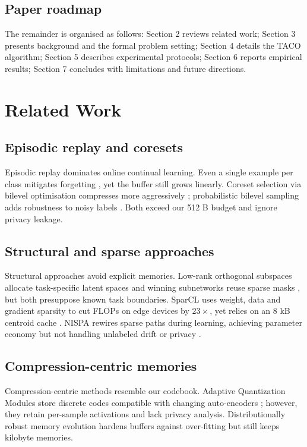 \documentclass{article}
\begin{document}
\subsection{Paper roadmap}
The remainder is organised as follows: Section 2 reviews related work; Section 3 presents background and the formal problem setting; Section 4 details the TACO algorithm; Section 5 describes experimental protocols; Section 6 reports empirical results; Section 7 concludes with limitations and future directions.

\section{Related Work}
\subsection{Episodic replay and coresets}
Episodic replay dominates online continual learning. Even a single example per class mitigates forgetting \cite{chaudhry-2019-continual}, yet the buffer still grows linearly. Coreset selection via bilevel optimisation compresses more aggressively \cite{borsos-2020-coresets}; probabilistic bilevel sampling adds robustness to noisy labels \cite{zhou-2023-probabilistic}. Both exceed our 512 B budget and ignore privacy leakage.

\subsection{Structural and sparse approaches}
Structural approaches avoid explicit memories. Low-rank orthogonal subspaces allocate task-specific latent spaces \cite{chaudhry-2020-continual} and winning subnetworks reuse sparse masks \cite{kang-2023-forget}, but both presuppose known task boundaries. SparCL uses weight, data and gradient sparsity to cut FLOPs on edge devices by $23\times$, yet relies on an 8 kB centroid cache \cite{wang-2022-sparcl}. NISPA rewires sparse paths during learning, achieving parameter economy but not handling unlabeled drift or privacy \cite{gurbuz-2022-nispa}.

\subsection{Compression-centric memories}
Compression-centric methods resemble our codebook. Adaptive Quantization Modules store discrete codes compatible with changing auto-encoders \cite{caccia-2019-online}; however, they retain per-sample activations and lack privacy analysis. Distributionally robust memory evolution hardens buffers against over-fitting \cite{wang-2022-improving} but still keeps kilobyte memories.
\end{document}
